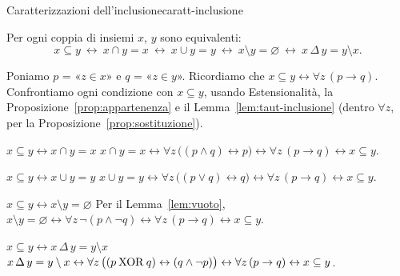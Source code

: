 \begin{concetto}
\begin{Proposizione}{Caratterizzazioni dell'inclusione}{caratt-inclusione}
    \begin{prerequisiti}
    \end{prerequisiti}
    Per ogni coppia di insiemi $x$, $y$ sono equivalenti:
    \[ x \subseteq y \ \leftrightarrow\ x \cap y = x \ \leftrightarrow\ x \cup y = y \ \leftrightarrow\ x \setminus y = \varnothing \ \leftrightarrow\ x \,\Delta\, y = y \setminus x. \]
\end{Proposizione}
\begin{dimostrazione}
    Poniamo $p$ = «$z \in x$» e $q$ = «$z \in y$». Ricordiamo che $x \subseteq y \leftrightarrow \forall z\,(p \rightarrow q)$.
    Confrontiamo ogni condizione con $x \subseteq y$, usando Estensionalità, la Proposizione~\ref{prop:appartenenza}
    e il Lemma~\ref{lem:taut-inclusione} (dentro $\forall z$, per la Proposizione~\ref{prop:sostituzione}).
    \begin{caso}{$x \subseteq y \leftrightarrow x \cap y = x$}
        $x \cap y = x \leftrightarrow \forall z\,\big((p \wedge q) \leftrightarrow p\big) \leftrightarrow \forall z\,(p \rightarrow q) \leftrightarrow x \subseteq y$.
    \end{caso}
    \begin{caso}{$x \subseteq y \leftrightarrow x \cup y = y$}
        $x \cup y = y \leftrightarrow \forall z\,\big((p \vee q) \leftrightarrow q\big) \leftrightarrow \forall z\,(p \rightarrow q) \leftrightarrow x \subseteq y$.
    \end{caso}
    \begin{caso}{$x \subseteq y \leftrightarrow x \setminus y = \varnothing$}
        Per il Lemma~\ref{lem:vuoto},
        $x \setminus y = \varnothing \leftrightarrow \forall z\,\neg(p \wedge \neg q) \leftrightarrow \forall z\,(p \rightarrow q) \leftrightarrow x \subseteq y$.
    \end{caso}
    \begin{caso}{$x \subseteq y \leftrightarrow x \,\Delta\, y = y \setminus x$}
        $x \,\Delta\, y = y \setminus x \leftrightarrow \forall z\,\big((p \mathbin{\mathrm{XOR}} q) \leftrightarrow (q \wedge \neg p)\big) \leftrightarrow \forall z\,(p \rightarrow q) \leftrightarrow x \subseteq y$.
    \end{caso}
\end{dimostrazione}
\end{concetto}


